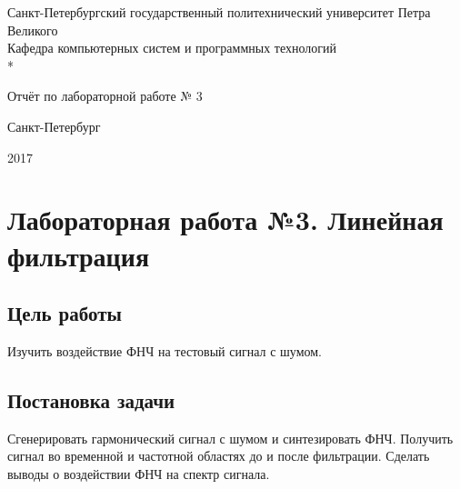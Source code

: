 \documentclass[a4paper,14pt]{article}
\begin{document}

\begin{titlepage}
	\newpage
	
	\begin{center}
		Санкт-Петербургский государственный политехнический 
		университет Петра Великого \\
		\vspace{1cm}
		Кафедра компьютерных систем и программных технологий\\*
	\end{center}
	
	\vspace{8em}
	
	\begin{center}
		 Отчёт по лабораторной работе № 3
	\end{center}
	
	\vspace{2.5em}

	\vspace{6em}

	\vspace{\fill}
	
	\begin{center}
		Санкт-Петербург
		
		 2017
	\end{center}
	
\end{titlepage}


\newpage

\tableofcontents

\newpage

\section{Лабораторная работа №3. Линейная фильтрация}
\subsection{Цель работы}
\hspace{0,5cm}  Изучить воздействие ФНЧ на тестовый сигнал с шумом.
\subsection{Постановка задачи}
\hspace{0,5cm}	 Сгенерировать гармонический сигнал с шумом
и синтезировать ФНЧ. Получить сигнал во временной и частотной
областях до и после фильтрации. Сделать выводы о воздействии
ФНЧ на спектр сигнала.
\end{document}
